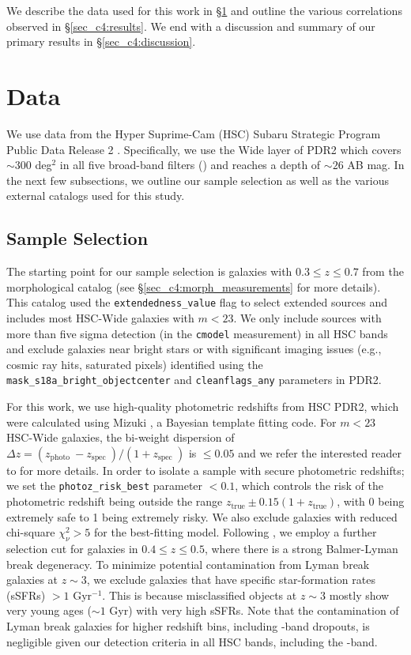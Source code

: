 We describe the data used for this work in \S \ref{sec_c4:data} and outline the various correlations observed in \S \ref{sec_c4:results}. We end with a discussion and summary of our primary results in \S \ref{sec_c4:discussion}.

\section{Data} \label{sec_c4:data}

We use data from the Hyper Suprime-Cam (HSC) Subaru Strategic Program Public Data Release 2 \citep[PDR2;][]{hsc_pdr2}. Specifically, we use the Wide layer of PDR2 which covers $\sim300$ deg$^2$ in all five broad-band filters (\gb\rb\ib\zb\yb) and reaches a depth of $\sim26$ AB mag. In the next few subsections, we outline our sample selection as well as the various external catalogs used for this study. 

\subsection{Sample Selection} \label{sec_c4:sample_selection}
The starting point for our sample selection is galaxies with $0.3 \leq z \leq 0.7$ from the \citet{hsc_wide_morphs} morphological catalog (see \S \ref{sec_c4:morph_measurements} for more details). This catalog used the \texttt{extendedness\_value} flag to select extended sources and includes most HSC-Wide galaxies with $m < 23$. We only include sources with more than five sigma detection (in the \texttt{cmodel} measurement) in all HSC bands and exclude galaxies near bright stars or with significant imaging issues (e.g., cosmic ray hits, saturated pixels) identified using the \texttt{mask\_s18a\_bright\_objectcenter} and \texttt{cleanflags\_any} parameters in PDR2. 

For this work, we use high-quality photometric redshifts from HSC PDR2, which were calculated using Mizuki \citep{mizuki}, a Bayesian template fitting code. For $m < 23$ HSC-Wide galaxies, the bi-weight dispersion of $\Delta z=\left(z_{\text {photo }}-z_{\text {spec }}\right) /\left(1+z_{\text {spec }}\right)$ is $\leq 0.05$ and we refer the interested reader to \citet{photoz_hsc_pdr2} for more details. In order to isolate a sample with secure photometric redshifts; we set the \texttt{photoz\_risk\_best} parameter $<0.1$, which controls the risk of the photometric redshift being outside the range $z_{\mathrm{true}} \pm 0.15(1+z_{\mathrm{true}})$, with 0 being extremely safe to 1 being extremely risky. We also exclude galaxies with reduced chi-square $\chi_{\nu}^2 > 5$ for the best-fitting model. Following \citet{hsc_den}, we employ a further selection cut for galaxies in $0.4 \leq z \leq 0.5$, where there is a strong Balmer-Lyman break degeneracy. To minimize potential contamination from Lyman break galaxies at $z\sim3$, we exclude galaxies that have specific star-formation rates (sSFRs)  $> 1$ Gyr$^{-1}$. This is because misclassified objects at $z\sim3$ mostly show very young ages ($\sim 1$ Gyr) with very high sSFRs. Note that the contamination of Lyman break galaxies for higher redshift bins, including \ib-band dropouts, is negligible given our detection criteria in all HSC bands, including the \gb-band. 


